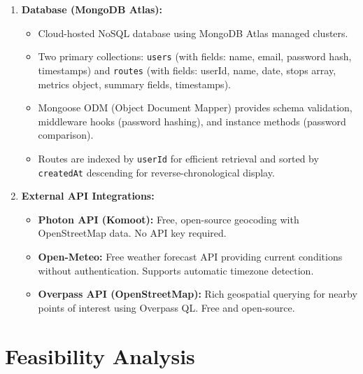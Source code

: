 \begin{enumerate}
\begin{itemize}
        \item Middleware stack includes: \texttt{cors()} for cross-origin request handling, \texttt{express.json()} for JSON body parsing, and a custom JWT authentication middleware for protecting route endpoints.
        \item Environment configuration managed through \texttt{dotenv} for secure handling of database URIs and JWT secrets.
        \item Health check endpoint (\texttt{GET /api/health}) for monitoring server availability.
    \end{itemize}
    \item \textbf{Database (MongoDB Atlas):}
    \begin{itemize}
        \item Cloud-hosted NoSQL database using MongoDB Atlas managed clusters.
        \item Two primary collections: \texttt{users} (with fields: name, email, password hash, timestamps) and \texttt{routes} (with fields: userId, name, date, stops array, metrics object, summary fields, timestamps).
        \item Mongoose ODM (Object Document Mapper) provides schema validation, middleware hooks (password hashing), and instance methods (password comparison).
        \item Routes are indexed by \texttt{userId} for efficient retrieval and sorted by \texttt{createdAt} descending for reverse-chronological display.
    \end{itemize}
    \item \textbf{External API Integrations:}
    \begin{itemize}
        \item \textbf{Photon API (Komoot):} Free, open-source geocoding with OpenStreetMap data. No API key required.
        \item \textbf{Open-Meteo:} Free weather forecast API providing current conditions without authentication. Supports automatic timezone detection.
        \item \textbf{Overpass API (OpenStreetMap):} Rich geospatial querying for nearby points of interest using Overpass QL. Free and open-source.
    \end{itemize}
\end{enumerate}

\section{Feasibility Analysis}

